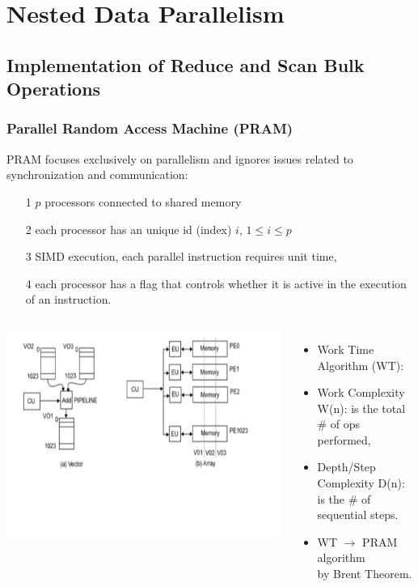 \documentclass{beamer}
\renewcommand{\emph}[1]{\textcolor{structure}{#1}}
\newcommand{\emp}[1]{\textcolor{DikuRed}{ #1}}
\begin{document}
\section{Nested Data Parallelism}

\begin{frame}[fragile]
	\tableofcontents[currentsection]
\end{frame}

\subsection{Implementation of Reduce and Scan Bulk Operations}

\begin{frame}[fragile,t]
  \frametitle{Parallel Random Access Machine (PRAM)}

PRAM focuses exclusively on parallelism and ignores issues
related to synchronization and communication:
\begin{itemize}
    \item[1] $p$ processors connected to shared memory
    \item[2] each processor has an unique id (index) $i$, $1 \leq i \leq p$
    \item[3] SIMD execution, each parallel instruction requires unit time,
    \item[4] each processor has a flag that controls whether it is active
                in the execution of an instruction.
\end  {itemize}


\begin{columns}
\includegraphics[height=37ex]{Ch1Figs/VectorMachine}
\vspace{-15ex}
\begin{itemize}
    \item \emp{Work Time Algorithm (WT):}
    \item \emp{Work Complexity W(n)}: is the total \# of ops performed,
    \item \emp{Depth/Step Complexity D(n)}: is the \# of sequential steps.\medskip
    \item \emph{WT $\longrightarrow$ PRAM algorithm\\by Brent Theorem}.
\end{itemize}
\end{columns}

\end{frame}
\end{document}
